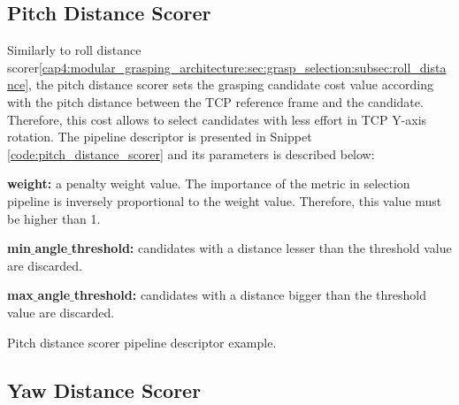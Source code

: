 \subsection{Pitch Distance Scorer}
\label{cap4:modular_grasping_architecture:sec:grasp_selection:subsec:pitch_distance}

Similarly to roll distance scorer\ref{cap4:modular_grasping_architecture:sec:grasp_selection:subsec:roll_distance}, the pitch distance scorer sets the grasping candidate cost value according with the pitch distance between the TCP reference frame and the candidate. Therefore, this cost allows to select candidates with less effort in TCP Y-axis rotation. The pipeline descriptor is presented in Snippet \ref{code:pitch_distance_scorer} and its parameters is described below:

\begin{itemize_jp}
    \item \textbf{weight:} a penalty weight value. The importance of the metric in selection pipeline is inversely proportional to the weight value. Therefore, this value must be higher than 1.
    \item \textbf{min$\_$angle$\_$threshold:} candidates with a distance lesser than the threshold value are discarded.
    \item \textbf{max$\_$angle$\_$threshold:} candidates with a distance bigger than the threshold value are discarded.
\end{itemize_jp}


\begin{snippet}
\centering
{}
\caption{Pitch distance scorer pipeline descriptor example.}
\label{code:pitch_distance_scorer}
\end{snippet}

\subsection{Yaw Distance Scorer}
\label{cap4:modular_grasping_architecture:sec:grasp_selection:subsec:yaw_distance}

